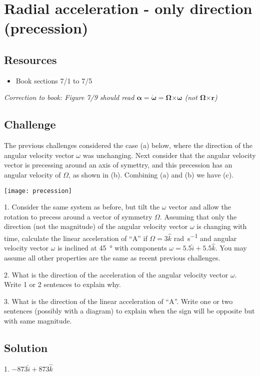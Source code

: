 \newpage
\section{Radial acceleration - only direction (precession)}

\subsection*{Resources}
\begin{itemize}
    \item Book sections 7/1 to 7/5
\end{itemize}

\emph{Correction to book: Figure 7/9 should read $\bm{\alpha} = \bm{\dot{\omega}} = \bm{\Omega} \bm{\times} \bm{\omega}$ (not $\bm{\Omega} \bm{\times} \bm{r}$)}

\subsection*{Challenge}
The previous challenges considered the case (a) below, where the direction of the angular velocity vector $\omega$ was unchanging. Next consider that the angular velocity vector is precessing around an axis of symettry, and this precession has an angular velocity of $\Omega$, as shown in (b). Combining (a) and (b) we have (c).

\texttt{[image: precession]}

1. Consider the same system as before, but tilt the $\omega$ vector and allow the rotation to precess around a vector of symmetry $\Omega$. Assuming that only the direction (not the magnitude) of the angular velocity vector $\omega$ is changing with time, calculate the linear acceleration of ``A'' if $\Omega = 3\hat{k}$ \si{\radian\per\second} and angular velocity vector $\omega$ is inclined at \SI{45}{\degree} with components $\omega = 5.5 \hat{i} + 5.5 \hat{k}$. You may assume all other properties are the same as recent previous challenges.

2. What is the direction of the acceleration of the angular velocity vector $\omega$. Write 1 or 2 sentences to explain why.

3. What is the direction of the linear acceleration of ``A''. Write one or two sentences (possibly with a diagram) to explain when the sign will be opposite but with same magnitude.


\subsection*{Solution}
1. $-873 \hat{i} + 873 \hat{k}$


